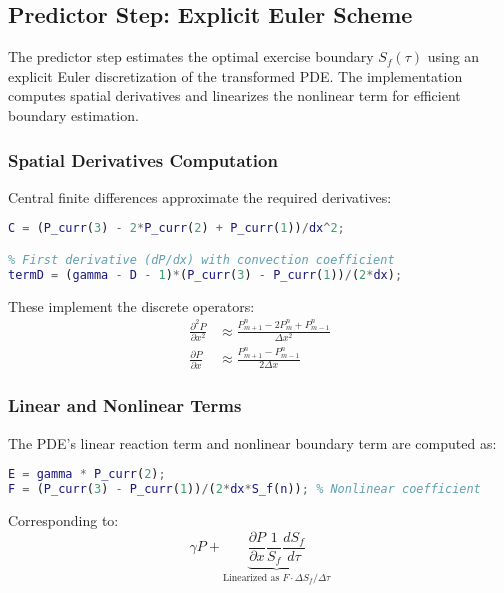 \documentclass{article}
\begin{document}
\subsection{Predictor Step: Explicit Euler Scheme}
\label{subsec:predictor}

The predictor step estimates the optimal exercise boundary \(S_f(\tau)\) using an explicit Euler discretization of the transformed PDE. The implementation computes spatial derivatives and linearizes the nonlinear term for efficient boundary estimation.

\subsubsection{Spatial Derivatives Computation}
Central finite differences approximate the required derivatives:

\begin{lstlisting}[language=Matlab,caption={Derivative calculations},label=code:derivs]
% Second derivative (d²P/dx²)
C = (P_curr(3) - 2*P_curr(2) + P_curr(1))/dx^2; 

% First derivative (dP/dx) with convection coefficient
termD = (gamma - D - 1)*(P_curr(3) - P_curr(1))/(2*dx); 
\end{lstlisting}

These implement the discrete operators:
\begin{align}
\frac{\partial^2 P}{\partial x^2} &\approx \frac{P_{m+1}^n - 2P_m^n + P_{m-1}^n}{\Delta x^2} \label{eq:diffusion}\\
\frac{\partial P}{\partial x} &\approx \frac{P_{m+1}^n - P_{m-1}^n}{2\Delta x} \label{eq:convection}
\end{align}

\subsubsection{Linear and Nonlinear Terms}
The PDE's linear reaction term and nonlinear boundary term are computed as:

\begin{lstlisting}[language=Matlab,caption={Term evaluations},label=code:terms]
E = gamma * P_curr(2);    
F = (P_curr(3) - P_curr(1))/(2*dx*S_f(n)); % Nonlinear coefficient
\end{lstlisting}

Corresponding to:
\begin{equation}
\gamma P + \underbrace{\frac{\partial P}{\partial x}\frac{1}{S_f}\frac{dS_f}{d\tau}}_{\text{Linearized as } F \cdot \Delta S_f/\Delta\tau} \label{eq:pde_terms}
\end{equation}
\end{document}
